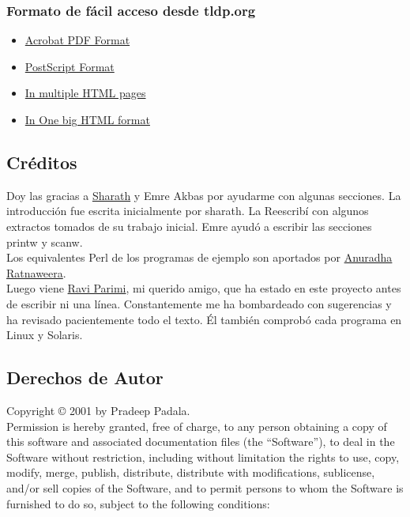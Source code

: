 \documentclass{article}
\begin{document}
\subsubsection{Formato de fácil acceso desde tldp.org}%
\begin{itemize}
  \item \href{http://www.ibiblio.org/pub/Linux/docs/HOWTO/other-formats/pdf/NCURSES-Programming-HOWTO.pdf}{Acrobat PDF Format}
  \item \href{http://www.ibiblio.org/pub/Linux/docs/HOWTO/other-formats/ps/NCURSES-Programming-HOWTO.ps.gz}{PostScript Format}
  \item \href{http://www.ibiblio.org/pub/Linux/docs/HOWTO/other-formats/html/NCURSES-Programming-HOWTO-html.tar.gz}{In multiple HTML pages}
  \item \href{http://www.ibiblio.org/pub/Linux/docs/HOWTO/other-formats/html_single/NCURSES-Programming-HOWTO.html}{In One big HTML format}
\end{itemize}

\subsection{Créditos}%
Doy las gracias a \href{sharath_1@usa.net}{Sharath} y Emre Akbas por ayudarme
con algunas secciones. La introducción fue escrita inicialmente por sharath. La
Reescribí con algunos extractos tomados de su trabajo inicial. Emre ayudó a
escribir las secciones printw y scanw.\\

Los equivalentes Perl de los programas de ejemplo son aportados por
\href{Aratnaweera@virtusa.com}{Anuradha Ratnaweera}.\\

Luego viene \href{parimi@ece.arizona.edu}{Ravi Parimi}, mi querido amigo, que
ha estado en este proyecto antes de escribir ni una línea. Constantemente me ha
bombardeado con sugerencias y ha revisado pacientemente todo el texto. Él
también comprobó cada programa en Linux y Solaris.\\

\subsection{Derechos de Autor}%
Copyright {\copyright} 2001 by Pradeep Padala.\\

Permission is hereby granted, free of charge, to any person obtaining a copy of
this software and associated documentation files (the “Software”), to deal in
the Software without restriction, including without limitation the rights to
use, copy, modify, merge, publish, distribute, distribute with modifications,
sublicense, and/or sell copies of the Software, and to permit persons to whom
the Software is furnished to do so, subject to the following conditions:\\
\end{document}
